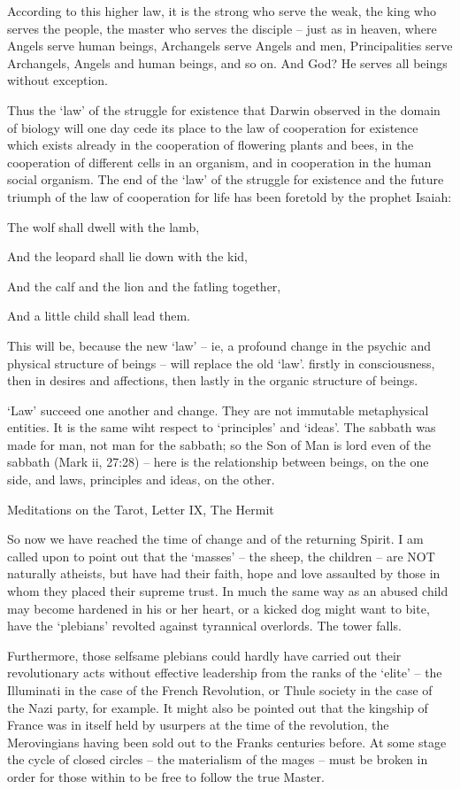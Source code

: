 \begin{footnotesize}
\begin{sffamily}
According to this higher law, it is the strong who serve the weak, the king who serves the people, the master who serves the disciple – just as in heaven, where Angels serve human beings, Archangels serve Angels and men, Principalities serve Archangels, Angels and human beings, and so on. And God? He serves all beings without exception.

Thus the `law' of the struggle for existence that Darwin observed in the domain of biology will one day cede its place to the law of cooperation for existence which exists already in the cooperation of flowering plants and bees, in the cooperation of different cells in an organism, and in cooperation in the human social organism. The end of the `law' of the struggle for existence and the future triumph of the law of cooperation for life has been foretold by the prophet Isaiah:

The wolf shall dwell with the lamb,

And the leopard shall lie down with the kid,

And the calf and the lion and the fatling together,

And a little child shall lead them.

This will be, because the new `law’ – ie, a profound change in the psychic and physical structure of beings – will replace the old `law'. firstly in consciousness, then in desires and affections, then lastly in the organic structure of beings.

`Law' succeed one another and change. They are not immutable metaphysical entities. It is the same wiht respect to `principles' and `ideas'. The sabbath was made for man, not man for the sabbath; so the Son of Man is lord even of the sabbath (Mark ii, 27:28) – here is the relationship between beings, on the one side, and laws, principles and ideas, on the other.

Meditations on the Tarot, Letter IX, The Hermit

So now we have reached the time of change and of the returning Spirit. I am called upon to point out that the `masses’ – the sheep, the children – are NOT naturally atheists, but have had their faith, hope and love assaulted by those in whom they placed their supreme trust. In much the same way as an abused child may become hardened in his or her heart, or a kicked dog might want to bite, have the `plebians' revolted against tyrannical overlords. The tower falls.

Furthermore, those selfsame plebians could hardly have carried out their revolutionary acts without effective leadership from the ranks of the `elite’ – the Illuminati in the case of the French Revolution, or Thule society in the case of the Nazi party, for example. It might also be pointed out that the kingship of France was in itself held by usurpers at the time of the revolution, the Merovingians having been sold out to the Franks centuries before. At some stage the cycle of closed circles – the materialism of the mages – must be broken in order for those within to be free to follow the true Master.



\end{sffamily}
\end{footnotesize}

